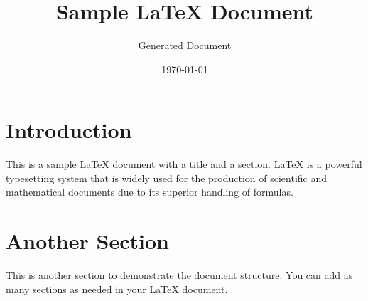 \documentclass{article}
\title{Sample LaTeX Document}
\author{Generated Document}
\date{\today}
\begin{document}
\maketitle

\section{Introduction}
This is a sample LaTeX document with a title and a section. LaTeX is a powerful typesetting system that is widely used for the production of scientific and mathematical documents due to its superior handling of formulas.

\section{Another Section}
This is another section to demonstrate the document structure. You can add as many sections as needed in your LaTeX document.
\end{document}
